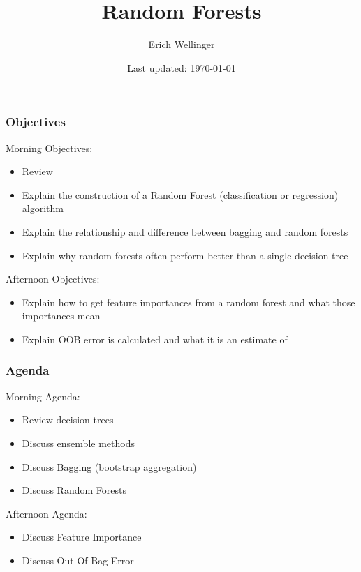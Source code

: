 \documentclass[table,dvipsnames]{beamer}
\title[Random Forests]{Random Forests}
\author[EKW]{Erich Wellinger}
\institute{Galvanize, Inc}
\date[\today]{Last updated: \today}
\newcommand{\keywd}{\textcolor{myorange}}
\begin{document}
\frame{\titlepage}
\frame{
\footnotesize
\tableofcontents
\normalsize
}


\begin{frame}
\frametitle{Objectives}
\scriptsize

Morning Objectives:
\begin{block}{}
\begin{itemize}
    \item Review
    \item Explain the construction of a \keywd{Random Forest} (classification or regression) algorithm
    \item Explain the relationship and difference between \keywd{bagging} and random forests
    \item Explain why random forests often perform better than a single decision tree
\end{itemize}
\end{block}

Afternoon Objectives:
\begin{block}{}
\begin{itemize}
    \item Explain how to get \keywd{feature importances} from a random forest and what those importances mean
    \item Explain \keywd{OOB error} is calculated and what it is an estimate of
\end{itemize}
\end{block}

\end{frame}


\begin{frame}
\frametitle{Agenda}
\scriptsize
Morning Agenda:

\begin{block}{}
\begin{itemize}
    \item Review decision trees
    \item Discuss ensemble methods
    \item Discuss \keywd{Bagging} (bootstrap aggregation)
    \item Discuss \keywd{Random Forests}
\end{itemize}
\end{block}

Afternoon Agenda:

\begin{block}{}
\begin{itemize}
    \item Discuss \keywd{Feature Importance}
    \item Discuss \keywd{Out-Of-Bag Error}
\end{itemize}
\end{block}
\end{frame}
\end{document}
